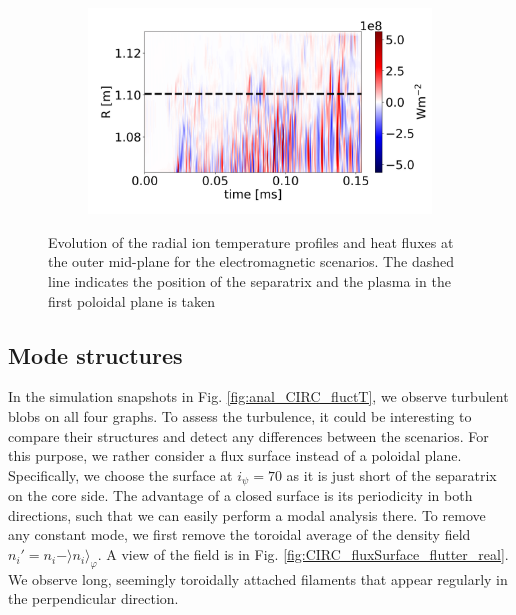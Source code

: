 \begin{figure}[H]
\begin{subfigure}[t]{0.45\textwidth}
	\end{subfigure}
	\begin{subfigure}[t]{0.45\textwidth}
		\centering
		\includegraphics[width=1\textwidth]{schemes/plotOMPtime_spec1_fluxE_psi_flutter.jpg}
	\end{subfigure}
	\caption[Evolution of the radial ion temperature profiles and heat fluxes at the outer mid-plane for the electromagnetic scenarios]{Evolution of the radial ion temperature profiles and heat fluxes at the outer mid-plane for the electromagnetic scenarios. The dashed line indicates the position of the separatrix and the plasma in the first poloidal plane is taken}
	\label{fig:CIRC_EM_OMPevolution}
\end{figure}



\subsection{Mode structures}

In the simulation snapshots in Fig. \ref{fig:anal_CIRC_fluctT}, we observe turbulent blobs on all four graphs. To assess the turbulence, it could be interesting to compare their structures and detect any differences between the scenarios. For this purpose, we rather consider a flux surface instead of a poloidal plane. Specifically, we choose the surface at $i_\psi=70$ as it is just short of the separatrix on the core side. The advantage of a closed surface is its periodicity in both directions, such that we can easily perform a modal analysis there. To remove any constant mode, we first remove the toroidal average of the density field $n_i' = n_i-\rangle n_i\rangle_\varphi$. A view of the field is in Fig. \ref{fig:CIRC_fluxSurface_flutter_real}. We observe long, seemingly toroidally attached filaments that appear regularly in the perpendicular direction. \newline 

